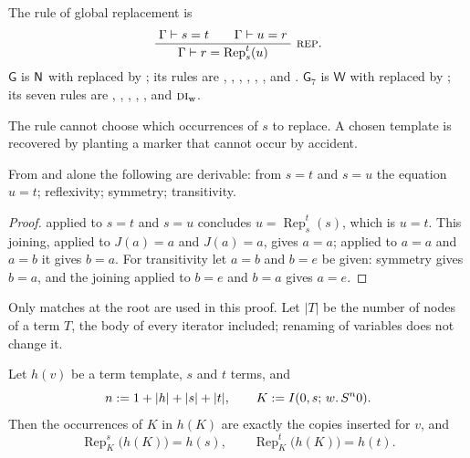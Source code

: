 \begin{definition}
\label{kern:def:G}
The rule of global replacement is
\[
 \infrule{\Gamma\proves s=t\qquad\Gamma\proves u=r}
         {\Gamma\proves r=\operatorname{Rep}_{s}^{t}(u)}\ \rulename{Rep}.
\]
$\mathsf{G}$ is $\mathsf{N}$ with  replaced by ; its
rules are , , , ,
, ,  and .
$\mathsf{G}_7$ is $\mathsf{W}$ with  replaced by ;
its seven rules are , , ,
, ,  and
$\rulename{DI}_{\mathrm{w}}$.
\end{definition}

The rule cannot choose which occurrences of $s$ to replace.  A chosen
template is recovered by planting a marker that cannot occur by accident.

\begin{lemma}
\label{kern:lem:geq}
From  and  alone the following are derivable:
from $s=t$ and $s=u$ the equation $u=t$; reflexivity; symmetry;
transitivity.
\end{lemma}

\begin{proof}
 applied to $s=t$ and $s=u$ concludes
$u=\operatorname{Rep}_{s}^{t}(s)$, which is $u=t$.  This joining, applied to
$J(a)=a$ and $J(a)=a$, gives $a=a$; applied to $a=a$ and $a=b$ it gives
$b=a$.  For transitivity let $a=b$ and $b=e$ be given: symmetry gives
$b=a$, and the joining applied to $b=e$ and $b=a$ gives $a=e$.
\end{proof}

Only matches at the root are used in this proof.  Let $|T|$ be the number of
nodes of a term $T$, the body of every iterator included; renaming of
variables does not change it.

\begin{lemma}
\label{kern:lem:marker}
Let $h(v)$ be a term template, $s$ and $t$ terms, and
\[
 n\mathrel{:=} 1+|h|+|s|+|t|,\qquad
 K\mathrel{:=}I(0,s;\,w.\,S^{n}0).
\]
Then the occurrences of $K$ in $h(K)$ are exactly the copies inserted for
$v$, and
\[
 \operatorname{Rep}_{K}^{s}\bigl(h(K)\bigr)=h(s),\qquad
 \operatorname{Rep}_{K}^{t}\bigl(h(K)\bigr)=h(t).
\]
\end{lemma}

